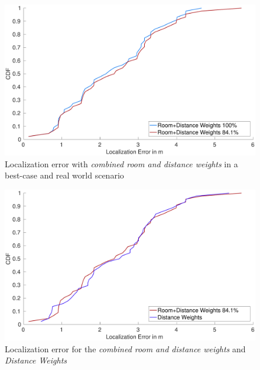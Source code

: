 \begin{figure}[bh]
\centering
\includegraphics[width=\textwidth]{Figures/WeightingCDF_realRW}
\decoRule
\caption[Weighting method comparison]{Localization error with \emph{combined room and distance weights} in a best-case and real world scenario}
\label{fig:WeightingCDFrealRoom}
\end{figure}

\begin{figure}
\centering
\includegraphics[width=\textwidth]{Figures/WeightingCDF_realDistance}
\decoRule
\caption[Weighting method comparison]{Localization error for the \emph{combined room and distance weights} and \emph{Distance Weights}}
\label{fig:WeightingCDFrealDistance}
\end{figure}